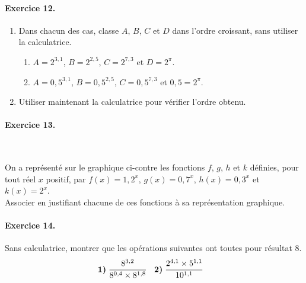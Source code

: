 \documentclass[11pt]{article}
\begin{document}
\paragraph{Exercice 12.}
\begin{enumerate}
  \item Dans chacun des cas, classe $A$, $B$, $C$ et $D$ dans l'ordre croissant,
    sans utiliser la calculatrice.
    \begin{enumerate}
      \item $A=2^{3,1}$, $B=2^{2,5}$, $C=2^{7,3}$ et $D=2^{\pi}$.
      \item $A=0,5^{3,1}$, $B=0,5^{2,5}$, $C=0,5^{7,3}$ et $0,5=2^{\pi}$.
    \end{enumerate}
  \item Utiliser maintenant la calculatrice pour vérifier l'ordre obtenu.
\end{enumerate}

\paragraph{Exercice 13.}~\\[-5mm]
\begin{minipage}{.6\textwidth}
  On a représenté sur le graphique ci-contre les fonctions $f$, $g$, $h$ et $k$
  définies, pour tout réel $x$ positif, par $f(x)=1,2^x$, $g(x)=0,7^x$,
  $h(x)=0,3^x$ et $k(x)=2^x$.\\
  Associer en justifiant chacune de ces fonctions à sa représentation graphique.
\end{minipage}
\begin{minipage}{.4\textwidth}
\begin{center}
\end{center}
\end{minipage}

\paragraph{Exercice 14.} Sans calculatrice, montrer que les opérations suivantes
ont toutes pour résultat $8$.
\begin{align*}
  \textbf{1)}\;& \cfrac{8^{3,2}}{8^{0,4}\times8^{1,8}} &
  \textbf{2)}\;& \cfrac{2^{4,1}\times5^{1,1}}{10^{1,1}}
\end{align*}
\end{document}
